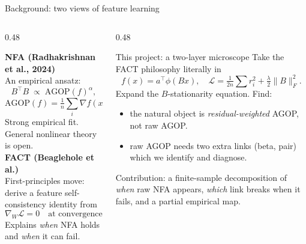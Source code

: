 \documentclass[10pt,aspectratio=169]{beamer}
\newcommand{\T}{^{\!\top}}
\begin{document}
\begin{frame}{Background: two views of feature learning}
  \footnotesize
  \begin{columns}[T,onlytextwidth]
    \begin{column}{0.48\textwidth}
      \begin{minipage}[t][0.75\textheight][t]{\linewidth}
      \textbf{NFA (Radhakrishnan et al., 2024)}\\[2pt]
      An empirical ansatz:
      \[
        B\T B \;\propto\; \mathrm{AGOP}(f)^{\alpha},
      \]
      \[
        \mathrm{AGOP}(f) = \tfrac{1}{n}\!\sum_i \nabla f(x_i)\nabla f(x_i)\T.
      \]
      Strong empirical fit. General nonlinear theory is open.
      \\[10pt]
      \textbf{FACT (Beaglehole et al.)}\\[2pt]
      First-principles move: derive a feature self-consistency identity from
      \[ \nabla_W \mathcal{L} = 0 \quad \text{at convergence.} \]
      Explains \emph{when} NFA holds and \emph{when} it can fail.
      \end{minipage}
    \end{column}
    \begin{column}[T]{0.48\textwidth}
      \begin{minipage}[t][0.75\textheight][t]{\linewidth}
      \vspace{-8pt}
      \begin{ibox}{This project: a two-layer microscope}
        Take the FACT philosophy literally in
        \[ f(x) = a\T \phi(Bx), \quad \mathcal{L} = \tfrac{1}{2n}\!\sum r_i^2 + \tfrac{\lambda}{2}\|B\|_F^2. \]
        Expand the $B$-stationarity equation. Find:
        \begin{itemize}\setlength\itemsep{1pt}
          \item the natural object is \emph{residual-weighted} AGOP, not raw AGOP.
          \item raw AGOP needs two extra links (beta, pair) which we identify and diagnose.
        \end{itemize}
      \end{ibox}
      \vspace{6pt}
      {\footnotesize\color{nicegray}
      Contribution: a finite-sample decomposition of \emph{when} raw NFA appears, \emph{which} link breaks when it fails, and a partial empirical map.}
      \end{minipage}
    \end{column}
  \end{columns}
\end{frame}
\end{document}
